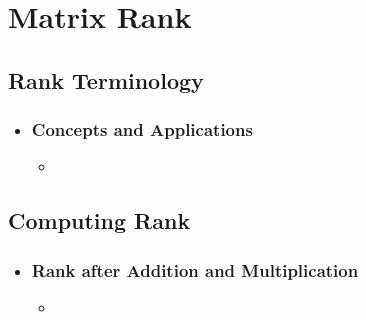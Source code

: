 \chapter{Matrix Rank}\label{Matrix Rank}
\section{Rank Terminology}\label{Rank Terminology}
\begin{itemize}
  \item []
  
  \subsection{Concepts and Applications}\label{Concepts and Applications}
  \begin{itemize}
    \item 
  \end{itemize}
  
\end{itemize}

\section{Computing Rank}\label{Computing Rank}
\begin{itemize}
  \item []
  
  \subsection{Rank after Addition and Multiplication}\label{Rank after Addition and Multiplication}
  \begin{itemize}
    \item 
  \end{itemize}
  
\end{itemize}


